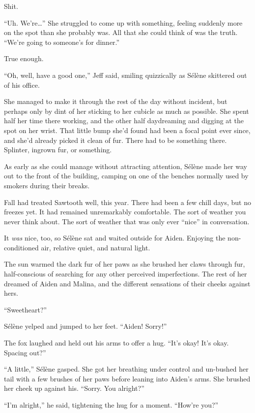 Shit.

``Uh. We're\ldots{}'' She struggled to come up with something, feeling suddenly more on the spot than she probably was. All that she could think of was the truth. ``We're going to someone's for dinner.''

True enough.

``Oh, well, have a good one,'' Jeff said, smiling quizzically as Sélène skittered out of his office.

She managed to make it through the rest of the day without incident, but perhaps only by dint of her sticking to her cubicle as much as possible. She spent half her time there working, and the other half daydreaming and digging at the spot on her wrist. That little bump she'd found had been a focal point ever since, and she'd already picked it clean of fur. There had to be something there. Splinter, ingrown fur, or something.

As early as she could manage without attracting attention, Sélène made her way out to the front of the building, camping on one of the benches normally used by smokers during their breaks.

Fall had treated Sawtooth well, this year. There had been a few chill days, but no freezes yet. It had remained unremarkably comfortable. The sort of weather you never think about. The sort of weather that was only ever ``nice'' in conversation.

It \emph{was} nice, too, so Sélène sat and waited outside for Aiden. Enjoying the non-conditioned air, relative quiet, and natural light.

The sun warmed the dark fur of her paws as she brushed her claws through fur, half-conscious of searching for any other perceived imperfections. The rest of her dreamed of Aiden and Malina, and the different sensations of their cheeks against hers.

``Sweetheart?''

Sélène yelped and jumped to her feet. ``Aiden! Sorry!''

The fox laughed and held out his arms to offer a hug. ``It's okay! It's okay. Spacing out?''

``A little,'' Sélène gasped. She got her breathing under control and un-bushed her tail with a few brushes of her paws before leaning into Aiden's arms. She brushed her cheek up against his. ``Sorry. You alright?''

``I'm alright,'' he said, tightening the hug for a moment. ``How're you?''


